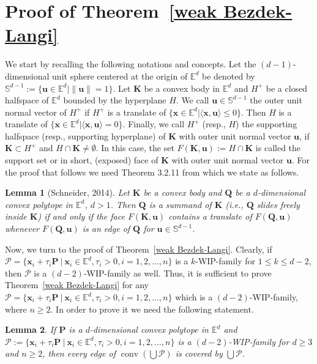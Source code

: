 \documentclass[12pt]{article}
\newtheorem{lem}{Lemma}
\DeclareMathOperator{\conv}{conv}
\newcommand{\xx}{\mathbf{x}}
\newcommand{\Sd}{\mathbb{S}^{d-1}}
\newcommand{\Ee}{{\mathbb E}}
\newcommand{\Ed}{\Ee^d}
\begin{document}
\section{Proof of Theorem~\ref{weak Bezdek-Langi}}


We start by recalling the following notations and concepts. Let the $(d-1)$-dimensional unit sphere centered at the origin of $\Ed$ be denoted by $\Sd:=\{\mathbf{u}\in\Ed | \|\mathbf{u}\|=1\}$. Let $\mathbf{K}$ be a convex body in $\Ed$ and $H^+$ be a closed halfspace of $\Ed$ bounded by the hyperplane $H$. We call $\mathbf{u}\in\Sd$ the outer unit normal vector of $H^+$ if $H^+$ is a translate of $\{\mathbf{x}\in\Ed | \langle \mathbf{x},\mathbf{u}\rangle\leq 0\}$. Then $H$ is a translate of $\{\mathbf{x}\in\Ed | \langle \mathbf{x},\mathbf{u}\rangle= 0\}$. Finally, we call $H^+$ (resp., $H$) the supporting halfspace (resp., supporting hyperplane) of $\mathbf{K}$ with outer unit normal vector $\mathbf{u}$, if $\mathbf{K}\subset H^+$ and $H\cap \mathbf{K}\neq\emptyset$. In this case, the set $F(\mathbf{K}, \mathbf{u}):=H\cap\mathbf{K}$ is called the support set or in short, (exposed) face of $\mathbf{K}$ with outer unit normal vector $\mathbf{u}$. For the proof that follows we need Theorem 3.2.11 from \cite{Sch14} which we state as follows.
\begin{lem}[Schneider, 2014]\label{Schneider Lemma}
Let $\mathbf{K}$ be a convex body and $\mathbf{Q}$ be a $d$-dimensional convex polytope in $\Ed$, $d>1$. Then $\mathbf{Q}$ is a summand of $\mathbf{K}$ (i.e., $\mathbf{Q}$ slides freely inside $\mathbf{K}$) if and only if the face $F(\mathbf{K}, \mathbf{u})$ contains a translate of $F(\mathbf{Q}, \mathbf{u})$ whenever $F(\mathbf{Q}, \mathbf{u})$ is an edge of $\mathbf{Q}$ for $\mathbf{u}\in\Sd$.
\end{lem}

Now, we turn to the proof of Theorem~\ref{weak Bezdek-Langi}. Clearly, if $\mathcal{P} = \{ \xx_i + \tau_i \mathbf{P}\ |\  \xx_i\in \Ee^d, \tau_i>0, i=1,2,\ldots, n\}$ is a $k$-WIP-family for $1\leq k\leq d-2$, then $\mathcal{P}$ is a $(d-2)$-WIP-family as well. Thus, it is sufficient to prove Theorem~\ref{weak Bezdek-Langi} for any $\mathcal{P}=\{ \xx_i + \tau_i \mathbf{P}\ |\  \xx_i\in \Ee^d, \tau_i>0, i=1,2,\ldots, n\}$ which is a $(d-2)$-WIP-family, where $n\geq 2$. In order to prove it we need the following statement.

\begin{lem}\label{covering an edge by edges}
If $\mathbf{P}$ is a $d$-dimensional convex polytope in $\Ee^d$ and $\mathcal{P} := \{ \xx_i + \tau_i \mathbf{P}\ |\  \xx_i\in \Ee^d, \tau_i>0, i=1,2,\ldots, n\}$ is a $(d-2)$-WIP-family for $d\geq 3$ and $n\geq 2$, then every edge of $\conv  \left( \bigcup \mathcal{P} \right)$ is covered by $\bigcup \mathcal{P}$.
\end{lem}
\end{document}
